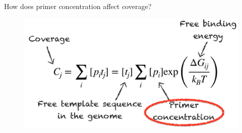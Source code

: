\documentclass[10pt]{beamer}
\newcommand\Wider[2][3em]{%
\makebox[\linewidth][c]{%
  \begin{minipage}{\dimexpr\textwidth+#1\relax}
  \raggedright#2
  \end{minipage}%
  }%
}
\begin{document}
\begin{frame}{How does primer concentration affect coverage?}
  \vspace{-0.8cm}
  \begin{figure}
    \includegraphics[scale=0.23]{model_w_labels_primer_mark.png}
  \end{figure}
  \smallskip
  \begin{columns}
    \begin{column}{0.3\linewidth}
\end{column}
\end{columns}
\end{frame}
\end{document}
